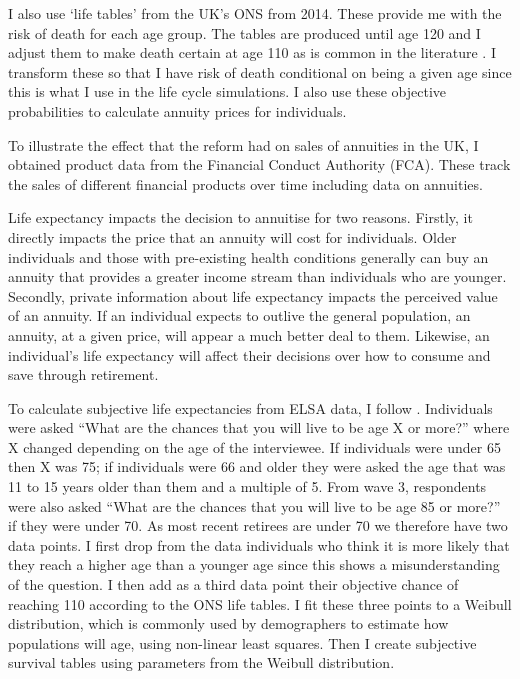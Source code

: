 \documentclass[12pt]{article}
\begin{document}
I also use `life tables' from the UK's ONS from 2014. These provide me with the
risk of death for each age group. The tables are produced until age 120 and I
adjust them to make death certain at age 110 as is common in the literature
\citep{odea_sturrock_rest_2023}. I transform these so that I have risk of death
conditional on being a given age since this is what I use in the life cycle
simulations. I also use these objective probabilities to calculate annuity
prices for individuals.

To illustrate the effect that the reform had on sales of annuities in the UK, I
obtained product data from the Financial Conduct Authority (FCA). These track the
sales of different financial products over time including data on annuities.

Life expectancy impacts the decision to annuitise for two reasons. Firstly, it
directly impacts the price that an annuity will cost for individuals. Older
individuals and those with pre-existing health conditions generally can buy an
annuity that provides a greater income stream than individuals who are younger.
Secondly, private information about life expectancy impacts the perceived value
of an annuity. If an individual expects to outlive the general population, an
annuity, at a given price, will appear a much better deal to them. Likewise, an
individual's life expectancy will affect their decisions over how to consume and
save through retirement.

To calculate subjective life expectancies from ELSA data, I follow
\cite{odea_sturrock_rest_2023}. Individuals were asked “What are the chances
that you will live to be age X or more?” where X changed depending on the age of
the interviewee. If individuals were under 65 then X was 75; if individuals were
66 and older they were asked the age that was 11 to 15 years older than them and
a multiple of 5. From wave 3, respondents were also asked “What are the chances
that you will live to be age 85 or more?” if they were under 70. As most recent
retirees are under 70 we therefore have two data points. I first drop from the
data individuals who think it is more likely that they reach a higher age than a
younger age since this shows a misunderstanding of the question. I then add as a
third data point their objective chance of reaching 110 according to the ONS
life tables. I fit these three points to a Weibull distribution, which is
commonly used by demographers to estimate how populations will age, using
non-linear least squares. Then I create subjective survival tables using
parameters from the Weibull distribution.
\end{document}
